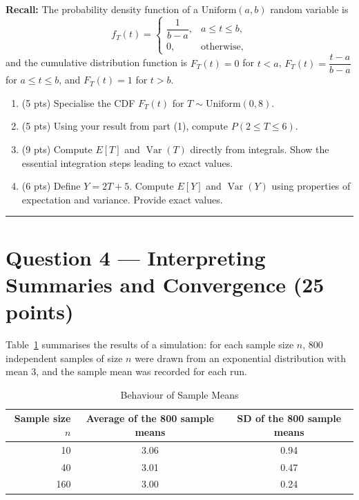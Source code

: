 \documentclass[11pt]{article}
\begin{document}
\medskip
\noindent\textbf{Recall:} The probability density function of a $\mathrm{Uniform}(a,b)$ random variable is
\[
f_T(t) =
\begin{cases}
\dfrac{1}{b-a}, & a \le t \le b,\\
0, & \text{otherwise},
\end{cases}
\]
and the cumulative distribution function is $F_T(t) = 0$ for $t<a$, $F_T(t) = \dfrac{t-a}{b-a}$ for $a \le t \le b$, and $F_T(t) = 1$ for $t>b$.

\begin{enumerate}
  \item (5 pts) Specialise the CDF $F_T(t)$ for $T \sim \mathrm{Uniform}(0,8)$.
  \item (5 pts) Using your result from part (1), compute $P(2 \le T \le 6)$.
  \item (9 pts) Compute $E[T]$ and $\operatorname{Var}(T)$ directly from integrals. Show the essential integration steps leading to exact values.
  \item (6 pts) Define $Y = 2T + 5$. Compute $E[Y]$ and $\operatorname{Var}(Y)$ using properties of expectation and variance. Provide exact values.
\end{enumerate}

\vspace{0.75em}
\hrule
\vspace{0.75em}

\section*{Question 4 — Interpreting Summaries and Convergence (25 points)}

Table~\ref{tab:b-sim} summarises the results of a simulation: for each sample size $n$, 800 independent samples of size $n$ were drawn from an exponential distribution with mean $3$, and the sample mean was recorded for each run.

\begin{table}[h]
\centering
\caption{Behaviour of Sample Means}\label{tab:b-sim}
\begin{tabular}{@{}rcc@{}}
\toprule
\textbf{Sample size $n$} & \textbf{Average of the 800 sample means} & \textbf{SD of the 800 sample means}\\
\midrule
10  & 3.06 & 0.94 \\
40  & 3.01 & 0.47 \\
160 & 3.00 & 0.24 \\
\bottomrule
\end{tabular}
\end{table}
\end{document}
